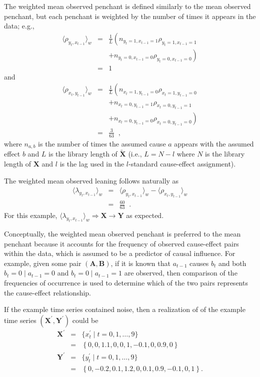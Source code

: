\documentclass{article}[10pt]
\begin{document}
The weighted mean observed penchant is defined similarly to the mean observed penchant, but each penchant is weighted by the number of times it appears in the data; e.g.,\
\begin{eqnarray*}
\langle \rho_{y_t,x_{t-1}} \rangle_w &=& \frac{1}{L}\left(n_{y_t=1,x_{t-1}=1}\rho_{y_t=1,x_{t-1}=1} \right.\\
& & \left.+ n_{y_t=0,x_{t-1}=0}\rho_{y_t=0,x_{t-1}=0}\right)\\
&=& 1
\end{eqnarray*}
and
\begin{eqnarray*}
\langle \rho_{x_t,y_{t-1}} \rangle_w &=& \frac{1}{L}\left(n_{x_t=1,y_{t-1}=0}\rho_{x_t=1,y_{t-1}=0} \right.\\
& & +n_{x_t=0,y_{t-1}=1}\rho_{x_t=0,y_{t-1}=1}\\
& & \left.+ n_{x_t=0,y_{t-1}=0}\rho_{x_t=0,y_{t-1}=0}\right)\\
&=& \frac{3}{63}\;\;,
\end{eqnarray*}
where $n_{a,b}$ is the number of times the assumed cause $a$ appears with the assumed effect $b$ and $L$ is the library length of $\tilde{\mathbf{X}}$ (i.e., $L=N-l$ where $N$ is the library length of $\mathbf{X}$ and $l$ is the lag used in the $l$-standard cause-effect assignment).  

The weighted mean observed leaning follows naturally as
\begin{eqnarray*}
\langle \lambda_{y_t,x_{t-1}} \rangle_w &=& \langle \rho_{y_t,x_{t-1}} \rangle_w - \langle \rho_{x_t,y_{t-1}} \rangle_w\\
&=& \frac{60}{63}\;\;.
\end{eqnarray*}
For this example, $\langle \lambda_{y_t,x_{t-1}} \rangle_w\Rightarrow \mathbf{X}\rightarrow\mathbf{Y}$ as expected.

Conceptually, the weighted mean observed penchant is preferred to the mean penchant because it accounts for the frequency of observed cause-effect pairs within the data, which is assumed to be a predictor of causal influence.  For example, given some pair $(\mathbf{A},\mathbf{B})$, if it is known that $a_{t-1}$ causes $b_{t}$ and both $b_t = 0\; |\; a_{t-1} = 0$ and $b_t = 0\; |\; a_{t-1} = 1$ are observed, then comparison of the frequencies of occurrence is used to determine which of the two pairs represents the cause-effect relationship.

If the example time series contained noise, then a realization of of the example time series $(\mathbf{X}^\prime,\mathbf{Y}^\prime)$ could be
\begin{eqnarray*}
\mathbf{X}^\prime &=& \{x_t^\prime\; | \; t=0,1,\ldots,9\}\\
&=& \left\{0,0,1.1,0,0,1,-0.1,0,0.9,0\right\}\\
\mathbf{Y}^\prime &=& \{y_t^\prime\; | \; t=0,1,\ldots,9\}\\
&=& \left\{0,-0.2,0.1,1.2,0,0.1,0.9,-0.1,0,1\right\}.
\end{eqnarray*}
\end{document}
